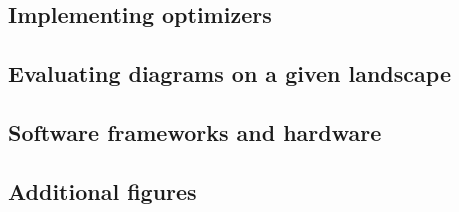 \documentclass{article}
\theoremstyle{plain}
\theoremstyle{definition}
\begin{document}
    \subsection{Implementing optimizers}                            %
    \subsection{Evaluating diagrams on a given landscape}           %
    \subsection{Software frameworks and hardware}                   %
    \subsection{Additional figures}                                 %
\end{document}
